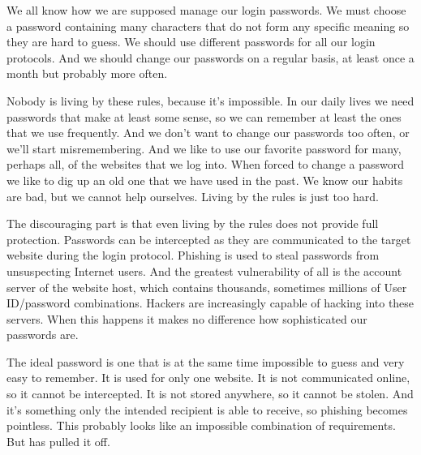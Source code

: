 We all know how we are supposed manage our login passwords.
We must choose a password containing many characters that do not form any specific meaning so they are hard to guess.
We should use different passwords for all our login protocols.
And we should change our passwords on a regular basis, at least once a month but probably more often.
\par
Nobody is living by these rules, because it's impossible.
In our daily lives we need passwords that make at least some sense, so we can remember at least the ones that we use frequently.
And we don't want to change our passwords too often, or we'll start misremembering.
And we like to use our favorite password for many, perhaps all, of the websites that we log into.
When forced to change a password we like to dig up an old one that we have used in the past.
We know our habits are bad, but we cannot help ourselves.
Living by the rules is just too hard.
\par
The discouraging part is that even living by the rules does not provide full protection.
Passwords can be intercepted as they are communicated to the target website during the login protocol.
Phishing is used to steal passwords from unsuspecting Internet users.
And the greatest vulnerability of all is the account server of the website host, which contains thousands, sometimes millions of User ID/password combinations.
Hackers are increasingly capable of hacking into these servers.
When this happens it makes no difference how sophisticated our passwords are.
\par
The ideal password is one that is at the same time impossible to guess and very easy to remember.
It is used for only one website.
It is not communicated online, so it cannot be intercepted.
It is not stored anywhere, so it cannot be stolen.
And it's something only the intended recipient is able to receive, so phishing becomes pointless.
This probably looks like an impossible combination of requirements.
But \TIMO has pulled it off.
%
%
